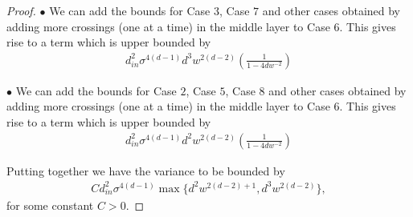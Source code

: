 \begin{proof}
$\bullet$ We can add the bounds for Case $3$, Case $7$ and other cases obtained by adding more crossings (one at a time) in the middle layer to Case $6$. This gives rise to a term which is upper bounded by 
\begin{align*}
d^2_{in}\sigma^{4(d-1)}d^3w^{2(d-2)} \left(\frac{1}{1-4dw^{-2}}\right)
\end{align*}



$\bullet$ We can add the bounds for Case $2$, Case $5$, Case $8$ and other cases obtained by adding more crossings (one at a time) in the middle layer to Case $6$. This gives rise to a term which is upper bounded by 
\begin{align*}
d^2_{in}\sigma^{4(d-1)}d^2w^{2(d-2)} \left(\frac{1}{1-4dw^{-2}}\right)
\end{align*}

Putting together we have the variance to be bounded by 
\begin{align*}
Cd^2_{in}\sigma^{4(d-1)}\max\{d^2w^{2(d-2)+1}, d^3w^{2(d-2)}\},
\end{align*}
for some constant $C>0$.
\end{proof}

